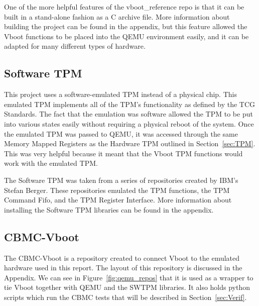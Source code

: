 One of the more helpful features of the vboot\_reference repo is that it can be
built in a stand-alone fashion as a C archive file.
More information about building the project can be found in the appendix, but
this feature allowed the Vboot functions to be placed into the QEMU environment
easily, and it can be adapted for many different types of hardware.

\subsection{Software TPM}

This project uses a software-emulated TPM instead of a physical chip. 
This emulated TPM implements all of the TPM's functionality as defined by the
TCG Standards.
The fact that the emulation was software allowed the TPM to be put into various
states easily without requiring a physical reboot of the system.
Once the emulated TPM was passed to QEMU, it was accessed through the same
Memory Mapped Registers as the Hardware TPM outlined in Section~\ref{sec:TPM}.
This was very helpful because it meant that the Vboot TPM functions would work
with the emulated TPM.

The Software TPM was taken from a series of repositories created by IBM's
Stefan Berger. 
These repositories emulated the TPM functions\cite{TPMLibs}, the TPM Command
Fifo\cite{SWTPM}, and the TPM Register Interface\cite{TPMQEMU}. 
More information about installing the Software TPM libraries can be found in the
appendix.

\subsection{CBMC-Vboot}

The CBMC-Vboot is a repository created to connect Vboot to the emulated
hardware used in this report\cite{my-repo}.
The layout of this repository is discussed in the Appendix.
We can see in Figure~\ref{fig:qemu_repos} that it is used as a wrapper to tie
Vboot together with QEMU and the SWTPM libraries.
It also holds python scripts which run the CBMC tests that will be described in
Section~\ref{sec:Verif}.
